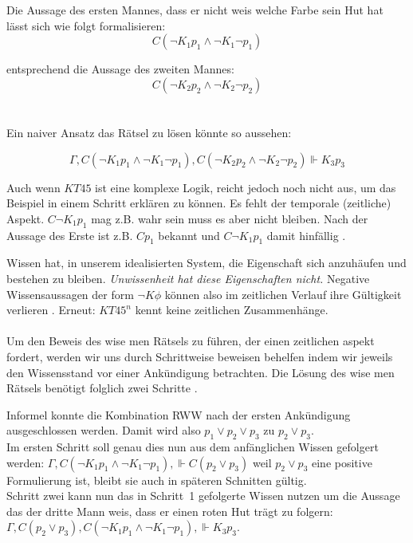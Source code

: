 \newline

Die Aussage des ersten Mannes, dass er nicht weis welche Farbe sein Hut hat lässt sich wie folgt formalisieren:
\begin{equation*}
	C(\neg K_1 p_1 \wedge \neg K_1 \neg p_1)
\end{equation*}

entsprechend die Aussage des zweiten Mannes:
\begin{equation*}
	C(\neg K_2 p_2 \wedge \neg K_2 \neg p_2)
\end{equation*}
\\\\

Ein naiver Ansatz das Rätsel zu lösen könnte so aussehen:

\begin{equation}
	\Gamma, C(\neg K_1 p_1 \wedge \neg K_1 \neg p_1), C(\neg K_2 p_2 \wedge \neg K_2 \neg p_2) \Vdash K_3 p_3
\end{equation}

Auch wenn $KT45$ ist eine komplexe Logik, reicht jedoch noch nicht aus, um das Beispiel in einem Schritt erklären zu können.
Es fehlt der temporale (zeitliche) Aspekt.
$C \neg K_1 p_1$ mag z.B. wahr sein muss es aber nicht bleiben.
Nach der Aussage des Erste ist z.B. $C p_1$ bekannt und $C \neg K_1 p_1$ damit hinfällig .

Wissen hat, in unserem idealisierten System, die Eigenschaft sich anzuhäufen und bestehen zu bleiben. 
\emph{Unwissenheit hat diese Eigenschaften nicht.}
Negative Wissensaussagen der form $\neg K \phi$ können also im zeitlichen Verlauf ihre Gültigkeit verlieren .
Erneut: $KT45^n$ kennt keine zeitlichen Zusammenhänge.\\\\

Um den Beweis des wise men Rätsels zu führen, der einen zeitlichen aspekt fordert, werden wir uns durch Schrittweise beweisen behelfen indem wir jeweils den Wissensstand vor einer Ankündigung betrachten.
Die Lösung des wise men Rätsels benötigt folglich zwei Schritte .

Informel konnte die Kombination RWW nach der ersten Ankündigung ausgeschlossen werden.
Damit wird also $p_1 \vee p_2 \vee p_3$ zu $p_2 \vee p_3$.\\
Im ersten Schritt soll genau dies nun aus dem anfänglichen Wissen gefolgert werden:
$\Gamma, C(\neg K_1 p_1 \wedge \neg K_1 \neg p_1), \Vdash C(p_2 \vee p_3)$
weil $p_2 \vee p_3$ eine positive Formulierung ist, bleibt sie auch in späteren Schnitten gültig.\\
Schritt zwei kann nun das in Schritt~1 gefolgerte Wissen nutzen um die Aussage das der dritte Mann weis, dass er einen roten Hut trägt zu folgern:
$\Gamma, C(p_2 \vee p_3), C(\neg K_1 p_1 \wedge \neg K_1 \neg p_1), \Vdash K_3 p_3$.\\\\

